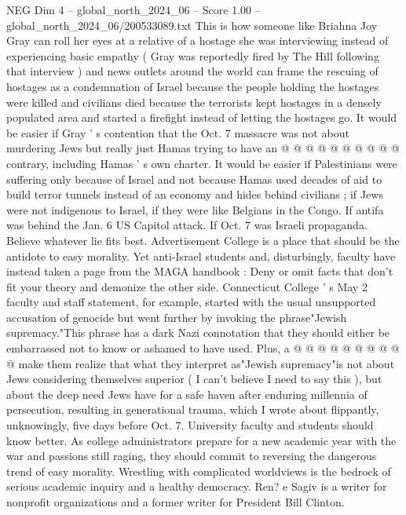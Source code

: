 \begin{textsample}{NEG Dim 4 – global\_north\_2024\_06 – Score 1.00 – global\_north\_2024\_06/200533089.txt}
This is how someone like Briahna Joy Gray can roll her eyes at a relative of a hostage she was interviewing instead of experiencing basic empathy ( Gray was reportedly fired by The Hill following that interview ) and news outlets around the world can frame the rescuing of hostages as a condemnation of Israel because the people holding the hostages were killed and civilians died because the terrorists kept hostages in a densely populated area and started a firefight instead of letting the hostages go.
It would be easier if Gray ' s contention that the Oct. 7 massacre was not about murdering Jews but really just Hamas trying to have an @ @ @ @ @ @ @ @ @ @ contrary, including Hamas ' s own charter.
It would be easier if Palestinians were suffering only because of Israel and not because Hamas used decades of aid to build terror tunnels instead of an economy and hides behind civilians ; if Jews were not indigenous to Israel, if they were like Belgians in the Congo.
If antifa was behind the Jan. 6 US Capitol attack.
If Oct. 7 was Israeli propaganda.
Believe whatever lie fits best.
Advertisement College is a place that should be the antidote to easy morality.
Yet anti-Israel students and, disturbingly, faculty have instead taken a page from the MAGA handbook : Deny or omit facts that don't fit your theory and demonize the other side.
Connecticut College ' s May 2 faculty and staff statement, for example, started with the usual unsupported accusation of genocide but went further by invoking the phrase"Jewish supremacy."This phrase has a dark Nazi connotation that they should either be embarrassed not to know or ashamed to have used.
Plus, a @ @ @ @ @ @ @ @ @ @ make them realize that what they interpret as"Jewish supremacy"is not about Jews considering themselves superior ( I can't believe I need to say this ), but about the deep need Jews have for a safe haven after enduring millennia of persecution, resulting in generational trauma, which I wrote about flippantly, unknowingly, five days before Oct. 7.
University faculty and students should know better.
As college administrators prepare for a new academic year with the war and passions still raging, they should commit to reversing the dangerous trend of easy morality.
Wrestling with complicated worldviews is the bedrock of serious academic inquiry and a healthy democracy.
Ren? e Sagiv is a writer for nonprofit organizations and a former writer for President Bill Clinton.

\end{textsample}
